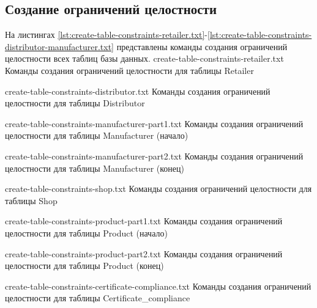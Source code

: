 \clearpage

\subsection{Создание ограничений целостности}

На листингах \ref{lst:create-table-constraints-retailer.txt}-\ref{lst:create-table-constraints-distributor-manufacturer.txt} представлены команды создания ограничений целостности всех таблиц базы данных.
{create-table-constraints-retailer.txt} %
{Команды создания ограничений целостности для таблицы Retailer} %

{create-table-constraints-distributor.txt} %
{Команды создания ограничений целостности для таблицы Distributor} %

{create-table-constraints-manufacturer-part1.txt} %
{Команды создания ограничений целостности для таблицы Manufacturer (начало)} %

{create-table-constraints-manufacturer-part2.txt} %
{Команды создания ограничений целостности для таблицы Manufacturer (конец)} %

{create-table-constraints-shop.txt} %
{Команды создания ограничений целостности для таблицы Shop} %

{create-table-constraints-product-part1.txt} %
{Команды создания ограничений целостности для таблицы Product (начало)} %

{create-table-constraints-product-part2.txt} %
{Команды создания ограничений целостности для таблицы Product (конец)} %

{create-table-constraints-certificate-compliance.txt} %
{Команды создания ограничений целостности для таблицы Certificate\_compliance} %

